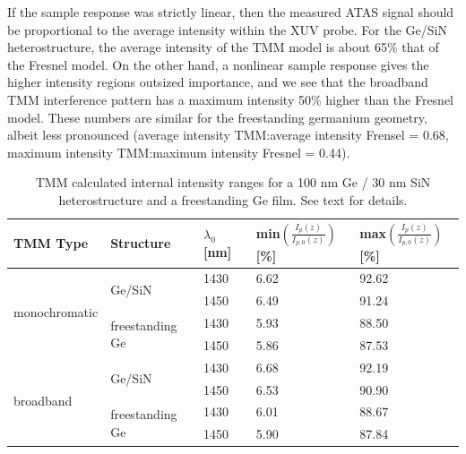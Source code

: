 If the sample response was strictly linear, then the measured ATAS signal should be proportional to the average intensity within the XUV probe. For the Ge/SiN heterostructure, the average intensity of the TMM model is about 65\% that of the Fresnel model. On the other hand, a nonlinear sample response gives the higher intensity regions outsized importance, and we see that the broadband TMM interference pattern has a maximum intensity 50\% higher than the Fresnel model. These numbers are similar for the freestanding germanium geometry, albeit less pronounced (average intensity TMM:average intensity Frensel = 0.68, maximum intensity TMM:maximum intensity Fresnel = 0.44).

\begin{table}[]
	\centering
	\begin{tabular}{l|l|l|l|l}
		\textbf{TMM Type} &
		\textbf{Structure} &
		\textbf{$\lambda_0$ {[}nm{]}} &
		\textbf{min$\left(\frac{I_p(z)}{I_{p,0}(z)}\right)$ {[}\%{]}} &
		\textbf{max$\left(\frac{I_p(z)}{I_{p,0}(z)}\right)$ {[}\%{]}} \\ \hline
		\multirow{4}{*}{monochromatic} & \multirow{2}{*}{Ge/SiN}          & 1430 & 6.62 & 92.62 \\
		&                                  & 1450 & 6.49 & 91.24\\ \cline{2-5} 
		& \multirow{2}{*}{freestanding Ge} & 1430 & 5.93 & 88.50 \\
		&                                  & 1450 & 5.86 & 87.53 \\ \hline
		\multirow{4}{*}{broadband}     & \multirow{2}{*}{Ge/SiN}          & 1430 & 6.68 & 92.19 \\
		&                                  & 1450 & 6.53 & 90.90 \\ \cline{2-5} 
		& \multirow{2}{*}{freestanding Ge} & 1430 & 6.01 & 88.67 \\
		&                                  & 1450 & 5.90 & 87.84
	\end{tabular}
	\caption{TMM calculated internal intensity ranges for a 100 nm Ge / 30 nm SiN heterostructure and a freestanding Ge film. See text for details.}
	\label{tab:TMM_intensity_range}
\end{table}
